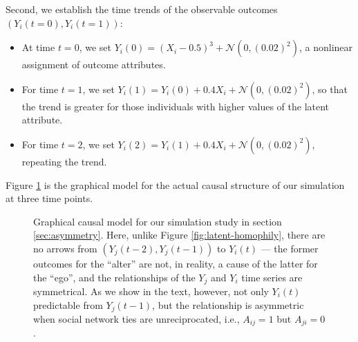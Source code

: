 \documentclass{article}
\begin{document}
\begin{multicols}{2}
Second, we establish the time trends of the observable outcomes $(Y_i(t=0),
Y_i(t=1))$:
\begin{itemize}
\item At time $t=0$, we set $Y_i(0) = (X_i-0.5)^3 + \mathcal{N}(0,(0.02)^2)$, a
  nonlinear assignment of outcome attributes.
\item For time $t=1$, we set $Y_i(1) = Y_i(0)+0.4X_i+\mathcal{N}(0,(0.02)^2)$,
  so that the trend is greater for those individuals with higher values of the
  latent attribute.
\item For time $t=2$, we set $Y_i(2) = Y_i(1)+0.4X_i+\mathcal{N}(0,(0.02)^2)$,
  repeating the trend.
\end{itemize}

Figure \ref{fig:asymmetry-model} is the graphical model for the actual causal
structure of our simulation at three time points.

\begin{figure}
\begin{center}
\end{center}
\caption{Graphical causal model for our simulation study in section
  \ref{sec:asymmetry}.  Here, unlike Figure \ref{fig:latent-homophily}, there
  are no arrows from $(Y_j(t-2), Y_j(t-1))$ to $Y_i(t)$ --- the former outcomes
  for the ``alter'' are not, in reality, a cause of the latter for the ``ego'',
  and the relationships of the $Y_j$ and $Y_i$ time series are symmetrical.  As
  we show in the text, however, not only $Y_{i}(t)$ predictable from
  $Y_j(t-1)$, but the relationship is asymmetric when social network ties are
  unreciprocated, i.e., $A_{ij}=1$ but $A_{ji}=0$.}
\label{fig:asymmetry-model}
\end{figure}



\end{multicols}
\end{document}
